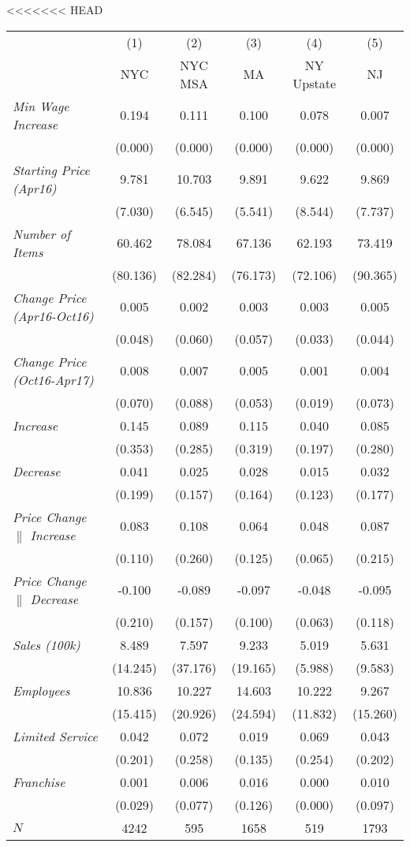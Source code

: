 <<<<<<< HEAD
\begin{center}
\begin{tabular}{lccccc}
\hline  & (1) & (2) & (3) & (4) & (5)\\
 & NYC & NYC MSA & MA & NY Upstate & NJ\\
\hline  \textit{Min Wage Increase}  & 0.194 & 0.111 & 0.100 & 0.078 & 0.007\\
  & (0.000) & (0.000) & (0.000) & (0.000) & (0.000)\\
 \textit{Starting Price (Apr16)}  & 9.781 & 10.703 & 9.891 & 9.622 & 9.869\\
  & (7.030) & (6.545) & (5.541) & (8.544) & (7.737)\\
 \textit{Number of Items}  & 60.462 & 78.084 & 67.136 & 62.193 & 73.419\\
  & (80.136) & (82.284) & (76.173) & (72.106) & (90.365)\\
 \textit{Change Price (Apr16-Oct16)}  & 0.005 & 0.002 & 0.003 & 0.003 & 0.005\\
  & (0.048) & (0.060) & (0.057) & (0.033) & (0.044)\\
 \textit{Change Price (Oct16-Apr17)}  & 0.008 & 0.007 & 0.005 & 0.001 & 0.004\\
  & (0.070) & (0.088) & (0.053) & (0.019) & (0.073)\\
 \textit{Increase}  & 0.145 & 0.089 & 0.115 & 0.040 & 0.085\\
  & (0.353) & (0.285) & (0.319) & (0.197) & (0.280)\\
 \textit{Decrease}  & 0.041 & 0.025 & 0.028 & 0.015 & 0.032\\
  & (0.199) & (0.157) & (0.164) & (0.123) & (0.177)\\
 \textit{Price Change $\|$ Increase}  & 0.083 & 0.108 & 0.064 & 0.048 & 0.087\\
  & (0.110) & (0.260) & (0.125) & (0.065) & (0.215)\\
 \textit{Price Change $\|$ Decrease}  & -0.100 & -0.089 & -0.097 & -0.048 & -0.095\\
  & (0.210) & (0.157) & (0.100) & (0.063) & (0.118)\\
 \textit{Sales (100k)}  & 8.489 & 7.597 & 9.233 & 5.019 & 5.631\\
  & (14.245) & (37.176) & (19.165) & (5.988) & (9.583)\\
 \textit{Employees} & 10.836 & 10.227 & 14.603 & 10.222 & 9.267\\
  & (15.415) & (20.926) & (24.594) & (11.832) & (15.260)\\
 \textit{Limited Service}  & 0.042 & 0.072 & 0.019 & 0.069 & 0.043\\
  & (0.201) & (0.258) & (0.135) & (0.254) & (0.202)\\
 \textit{Franchise}  & 0.001 & 0.006 & 0.016 & 0.000 & 0.010\\
  & (0.029) & (0.077) & (0.126) & (0.000) & (0.097)\\
\hline  $ N $  & 4242 & 595 & 1658 & 519 & 1793\\
\hline\end{tabular}\\
\end{center}
